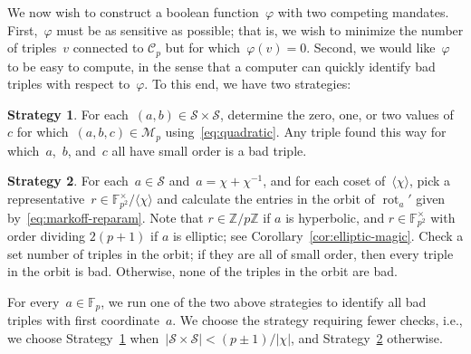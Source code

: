 \documentclass{article}
\DeclareMathOperator{\rot}{rot}
\theoremstyle{definition}
\newtheorem{strategy}{Strategy}
\theoremstyle{remark}
\begin{document}
We now wish to construct a boolean function~$\varphi$ with two competing mandates.
First,~$\varphi$ must be as sensitive as possible; that is, we wish to minimize the number of triples~$v$ connected to $\mathcal{C}_p$ but for which~$\varphi(v) = 0$.
Second, we would like~$\varphi$ to be easy to compute, in the sense that a computer can quickly identify bad triples with respect to~$\varphi$.
To this end, we have two strategies:

\begin{strategy}\label{str:cartesian}
    For each~$(a, b) \in \mathcal{S} \times \mathcal{S}$, determine the zero, one, or two values of~$c$ for which~$(a, b, c) \in \mathcal{M}_p$ using~\eqref{eq:quadratic}.
    Any triple found this way for which~$a$,~$b$, and~$c$ all have small order is a bad triple.
\end{strategy}

\begin{strategy}\label{str:cosets}
    For each~$a \in \mathcal{S}$ and~$a = \chi + \chi^{-1}$, and for each coset of~$\langle \chi \rangle$, pick a representative~$r \in \mathbb{F}_{p^2}^\times / \langle \chi \rangle$ and calculate the entries in the orbit of $\rot_a'$ given by~\eqref{eq:markoff-reparam}.
    Note that $r \in \mathbb{Z} / p\mathbb{Z}$ if $a$ is hyperbolic, and $r \in \mathbb{F}_{p^2}^\times$ with order dividing $2(p + 1)$ if $a$ is elliptic; see Corollary~\ref{cor:elliptic-magic}.
    Check a set number of triples in the orbit\footnotemark; if they are all of small order, then every triple in the orbit is bad.
    Otherwise, none of the triples in the orbit are bad.
\end{strategy}

For every~$a \in \mathbb{F}_p$, we run one of the two above strategies to identify all bad triples with first coordinate~$a$.
We choose the strategy requiring fewer checks, i.e., we choose Strategy~\ref{str:cartesian} when~$|\mathcal{S} \times \mathcal{S}| < (p \pm 1) / |\chi|$, and Strategy~\ref{str:cosets} otherwise.
\end{document}
